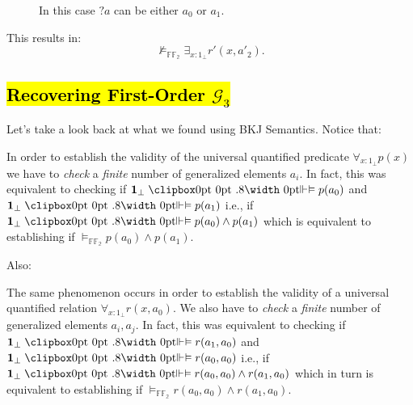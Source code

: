 \begin{ex}
\begin{figure}[h]
		\caption{In this case $?a$ can be either $a_0$ or $a_1$.}	
	\end{figure}
	\newline
	This results in:
	\begin{equation*}
		\not\models_{\mathbb{FF_2}} \exists_{x:1_\bot} r'(x,a'_2).
	\end{equation*}
\end{ex}


\newpage
\subsection{\hl{Recovering First-Order $\mathcal{G}_3$}}		

Let's take a look back at what we found using BKJ Semantics.	
		Notice that:
		\begin{remark}
			In order to establish the validity of the universal quantified predicate $\forall_{x:1_\bot} p(x)$ we have to \emph{check} a \emph{finite} number of generalized elements $a_i$.
			In fact, this was equivalent to checking if $\textbf{1}_\bot \VDashA p(a_0)$ and $\textbf{1}_\bot \VDashA p(a_1)$  i.e., if $\textbf{1}_\bot \VDashA p(a_0) \land p(a_1) $ which is equivalent to establishing if $\models_{\mathbb{FF_2}} p(a_0) \land p(a_1) $.
		\end{remark}
		Also:
		\begin{remark}
			 The same phenomenon occurs in order to establish the validity of a universal quantified relation $\forall_{x:1_\bot} r(x,a_0)$. We also have to \emph{check} a \emph{finite} number of generalized elements $a_i,a_j$.
			In fact, this was equivalent to checking if $\textbf{1}_\bot \VDashA r(a_1,a_0)$ and $\textbf{1}_\bot \VDashA r(a_0,a_0)$  i.e., if 
			$\textbf{1}_\bot \VDashA r(a_0,a_0) \land r(a_1,a_0)$ which in turn is equivalent to establishing if $\models_{\mathbb{FF_2}} r(a_0,a_0) \land r(a_1,a_0) $.
		\end{remark} 
		 
